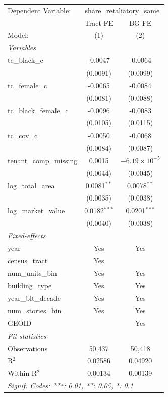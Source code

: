 \begingroup
\centering
\begin{tabular}{lcc}
   \tabularnewline \midrule \midrule
   Dependent Variable: & \multicolumn{2}{c}{share\_retaliatory\_same}\\
                           & Tract FE       & BG FE \\   
   Model:                  & (1)            & (2)\\  
   \midrule
   \emph{Variables}\\
   tc\_black\_c            & -0.0047        & -0.0064\\   
                           & (0.0091)       & (0.0099)\\   
   tc\_female\_c           & -0.0065        & -0.0084\\   
                           & (0.0081)       & (0.0088)\\   
   tc\_black\_female\_c    & -0.0096        & -0.0083\\   
                           & (0.0105)       & (0.0115)\\   
   tc\_cov\_c              & -0.0050        & -0.0068\\   
                           & (0.0084)       & (0.0087)\\   
   tenant\_comp\_missing   & 0.0015         & $-6.19\times 10^{-5}$\\    
                           & (0.0044)       & (0.0045)\\   
   log\_total\_area        & 0.0081$^{**}$  & 0.0078$^{**}$\\   
                           & (0.0035)       & (0.0038)\\   
   log\_market\_value      & 0.0182$^{***}$ & 0.0201$^{***}$\\   
                           & (0.0040)       & (0.0038)\\   
   \midrule
   \emph{Fixed-effects}\\
   year                    & Yes            & Yes\\  
   census\_tract           & Yes            & \\  
   num\_units\_bin         & Yes            & Yes\\  
   building\_type          & Yes            & Yes\\  
   year\_blt\_decade       & Yes            & Yes\\  
   num\_stories\_bin       & Yes            & Yes\\  
   GEOID                   &                & Yes\\  
   \midrule
   \emph{Fit statistics}\\
   Observations            & 50,437         & 50,418\\  
   R$^2$                   & 0.02586        & 0.04920\\  
   Within R$^2$            & 0.00134        & 0.00139\\  
   \midrule \midrule
   \multicolumn{3}{l}{\emph{Signif. Codes: ***: 0.01, **: 0.05, *: 0.1}}\\
\end{tabular}
